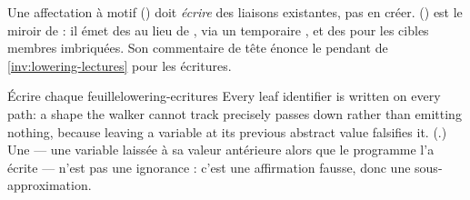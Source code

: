 Une affectation à motif (\code{[i, max] = [max, i]}) doit \emph{écrire} des liaisons existantes, pas en créer.  () est le miroir de  : il émet des  au lieu de , via un temporaire , et des  pour les cibles membres imbriquées. Son commentaire de tête énonce le pendant de \cref{inv:lowering-lectures} pour les écritures.

\begin{invariant}{Écrire chaque feuille}{lowering-ecritures}
\og Every leaf identifier is written on every path: a shape the walker cannot track precisely passes  down rather than emitting nothing, because leaving a variable at its previous abstract value falsifies it.\fg{} (.) Une  --- une variable laissée à sa valeur antérieure alors que le programme l'a écrite --- n'est pas une ignorance : c'est une affirmation fausse, donc une sous-approximation.
\end{invariant}

